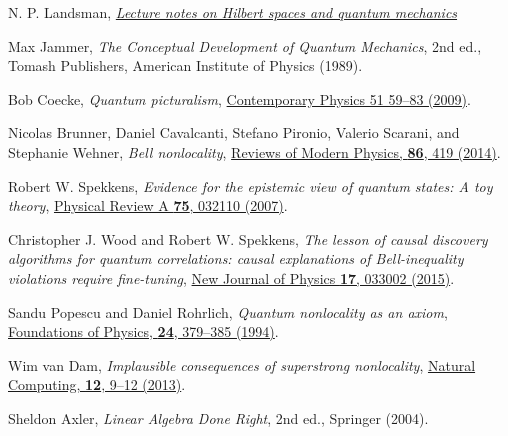 \documentclass[11pt,english]{article}
\theoremstyle{remark}
\begin{document}
\newpage
\begin{thebibliography}{99}
	
\begin{comment}
\bibitem{feynman-lectures}
Richard Feynman, Robert Leighton, and Matthew Sands, \emph{The Feynman Lectures on Physics}, Vol. 3, Addison-Wesley, Reading, Mass. (1965).
	
\bibitem{renes-book}
Joseph Renes, \emph{Quantum Information Theory: Concepts and Methods}, De Gruyter Oldenbourg (2022).

\bibitem{catani2021}
Lorenzo Catani, Matthew Leifer, David Schmid, and Robert Spekkens, \emph{Why interference phenomena do not capture the essence of quantum theory}, \href{https://arxiv.org/abs/2111.13727}{arXiv:2111.13727}
\end{comment}

N. P. Landsman, \href{https://www.math.ru.nl/~landsman/HSQM2006.pdf}{\emph{Lecture notes on Hilbert spaces and quantum mechanics}}

Max Jammer, \emph{The Conceptual Development of Quantum Mechanics}, 2nd ed., %
Tomash Publishers, American Institute of Physics (1989).

Bob Coecke, \emph{Quantum picturalism}, \href{https://doi.org/10.1080/00107510903257624}{Contemporary Physics 51 59–83 (2009)}.

Nicolas Brunner, Daniel Cavalcanti, Stefano Pironio, Valerio Scarani, and Stephanie Wehner, \emph{Bell nonlocality}, \href{https://doi.org/10.1103/RevModPhys.86.419}{Reviews of Modern Physics, {\bf 86}, 419 (2014)}.

Robert W. Spekkens, \emph{Evidence for the epistemic view of quantum states: A toy theory}, \href{https://doi.org/10.1103/PhysRevA.75.032110}{Physical Review A {\bf 75}, 032110 (2007)}.


Christopher J. Wood and Robert W. Spekkens, \emph{The lesson of causal discovery algorithms for quantum correlations: causal explanations of Bell-inequality violations require fine-tuning}, \href{https://doi.org/10.1088/1367-2630/17/3/033002}{New Journal of Physics {\bf 17}, 033002 (2015)}.

Sandu Popescu and Daniel Rohrlich, \emph{Quantum nonlocality as an axiom}, \href{https://doi.org/10.1007%2FBF02058098}{Foundations of Physics, {\bf 24}, 379–385 (1994)}.

Wim van Dam, \emph{Implausible consequences of superstrong nonlocality}, \href{https://doi.org/10.1007/s11047-012-9353-6}{Natural Computing, {\bf 12}, 9–12 (2013)}.

Sheldon Axler, \emph{Linear Algebra Done Right}, 2nd ed., Springer (2004).


\end{thebibliography}
\end{document}

